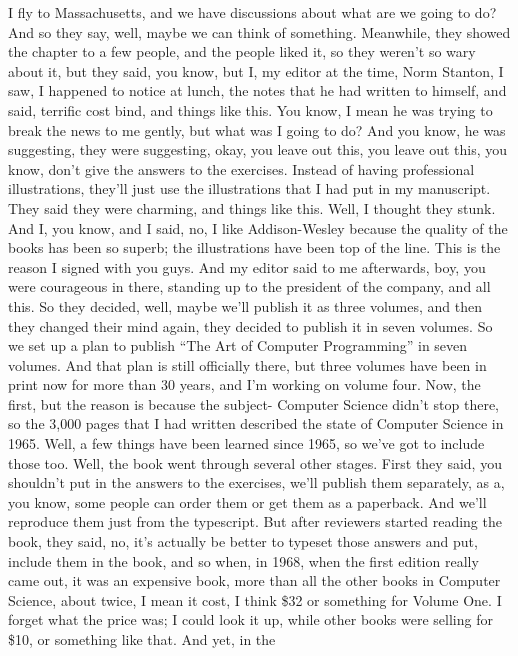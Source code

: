 \documentclass[]{article}
\begin{document}
I fly to Massachusetts, and we have discussions about what are we going
to do? And so they say, well, maybe we can think of something.
Meanwhile, they showed the chapter to a few people, and the people liked
it, so they weren't so wary about it, but they said, you know, but I, my
editor at the time, Norm Stanton, I saw, I happened to notice at lunch,
the notes that he had written to himself, and said, terrific cost bind,
and things like this. You know, I mean he was trying to break the news
to me gently, but what was I going to do? And you know, he was
suggesting, they were suggesting, okay, you leave out this, you leave
out this, you know, don't give the answers to the exercises. Instead of
having professional illustrations, they'll just use the illustrations
that I had put in my manuscript. They said they were charming, and
things like this. Well, I thought they stunk. And I, you know, and I
said, no, I like Addison-Wesley because the quality of the books has
been so superb; the illustrations have been top of the line. This is the
reason I signed with you guys. And my editor said to me afterwards, boy,
you were courageous in there, standing up to the president of the
company, and all this. So they decided, well, maybe we'll publish it as
three volumes, and then they changed their mind again, they decided to
publish it in seven volumes. So we set up a plan to publish ``The Art of
Computer Programming'' in seven volumes. And that plan is still
officially there, but three volumes have been in print now for more than
30 years, and I'm working on volume four. Now, the first, but the reason
is because the subject- Computer Science didn't stop there, so the 3,000
pages that I had written described the state of Computer Science in
1965. Well, a few things have been learned since 1965, so we've got to
include those too. Well, the book went through several other stages.
First they said, you shouldn't put in the answers to the exercises,
we'll publish them separately, as a, you know, some people can order
them or get them as a paperback. And we'll reproduce them just from the
typescript. But after reviewers started reading the book, they said, no,
it's actually be better to typeset those answers and put, include them
in the book, and so when, in 1968, when the first edition really came
out, it was an expensive book, more than all the other books in Computer
Science, about twice, I mean it cost, I think \$32 or something for
Volume One. I forget what the price was; I could look it up, while other
books were selling for \$10, or something like that. And yet, in the
\end{document}
